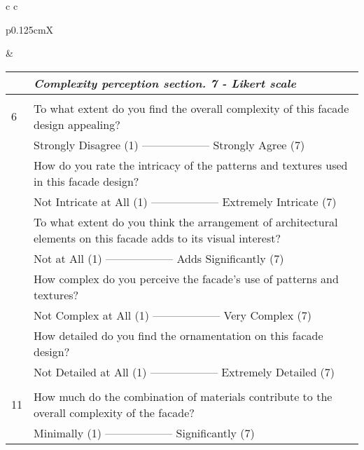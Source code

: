 \begin{table*}[!htb]
\begin{tabular}{c c}
\begin{minipage}{.48\linewidth}
\begin{tabularx}{\linewidth}{p{0.125cm}X}
        \end{tabularx}
        \end{minipage}
        &
        \begin{minipage}{.48\linewidth}
            \centering
            \label{tab:ComplexitySurvey}
            \small
            \begin{tabularx}{\linewidth}{p{0.125cm}X}
                    \toprule
                    & \textit{Complexity perception section. 7 - Likert scale} \\
                    \midrule
                    \\
                    6 & To what extent do you find the overall complexity of this facade design appealing?\\
                    & Strongly Disagree (1) —————— Strongly Agree (7) \\
                    \addlinespace
                    7 & How do you rate the intricacy of the patterns and textures used in this facade design? \\
                    & Not Intricate at All (1) —————— Extremely Intricate (7)\\
                    \addlinespace
                    8 & To what extent do you think the arrangement of architectural elements on this facade adds to its visual interest? \\
                    & Not at All (1) —————— Adds Significantly (7) \\
                    \addlinespace
                    9 & How complex do you perceive the facade's use of patterns and textures? \\
                    & Not Complex at All (1) —————— Very Complex (7) \\
                    \addlinespace
                    10 & How detailed do you find the ornamentation on this facade design? \\
                    & Not Detailed at All (1) —————— Extremely Detailed (7) \\
                    \addlinespace
                    \\
                    11 & How much do the combination of materials contribute to the overall complexity of the facade? \\
                    & Minimally (1) —————— Significantly (7) \\

\end{tabularx}
\end{minipage}
\end{tabular}
\end{table*}
